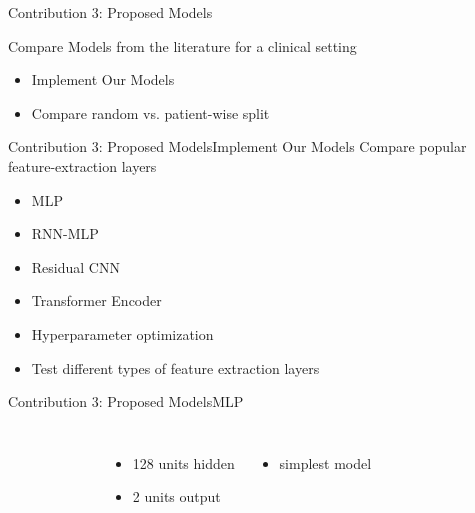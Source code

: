\begin{frame}{Contribution 3: Proposed Models}
    \begin{block}{Compare Models from the literature for a clinical setting}
        \begin{itemize}
            \item Implement Our Models
            \item Compare random vs. patient-wise split
        \end{itemize}
    \end{block}
\end{frame}

\begin{frame}{Contribution 3: Proposed Models}{Implement Our Models}
    Compare popular feature-extraction layers
    \begin{itemize}
        \item MLP
        \item RNN-MLP
        \item Residual CNN
        \item Transformer Encoder
    \end{itemize}

    \begin{itemize}
        \item Hyperparameter optimization
        \item Test different types of feature extraction layers
    \end{itemize}
\end{frame}

\begin{frame}{Contribution 3: Proposed Models}{MLP}
    \begin{columns}
        \begin{figure}
            
        \end{figure}

        \begin{itemize}
            \item 128 units hidden
            \item 2 units output
        \end{itemize}
        \begin{itemize}
            \item simplest model
        \end{itemize}
    \end{columns}

\end{frame}


